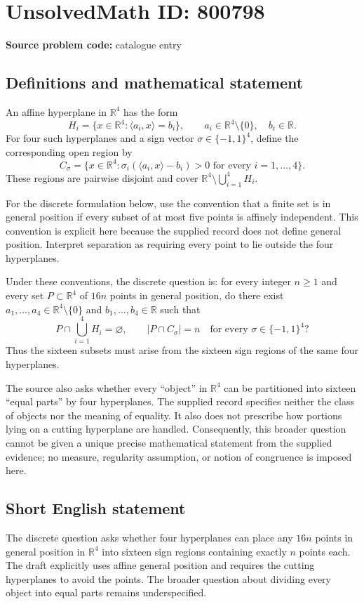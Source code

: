 \documentclass[11pt]{article}
\newcommand{\R}{\mathbb{R}}
\begin{document}
\section*{UnsolvedMath ID: 800798}
\textbf{Source problem code:} catalogue entry
\subsection{Definitions and mathematical statement}
An affine hyperplane in \(\R^4\) has the form
\[
H_i=\{x\in\R^4:\langle a_i,x\rangle=b_i\},\qquad a_i\in\R^4\setminus\{0\},\quad b_i\in\R.
\]
For four such hyperplanes and a sign vector \(\sigma\in\{-1,1\}^4\), define the corresponding open region by
\[
C_\sigma=\{x\in\R^4:\sigma_i(\langle a_i,x\rangle-b_i)>0\text{ for every }i=1,\ldots,4\}.
\]
These regions are pairwise disjoint and cover \(\R^4\setminus\bigcup_{i=1}^4H_i\).

For the discrete formulation below, use the convention that a finite set is in general position if every subset of at most five points is affinely independent. This convention is explicit here because the supplied record does not define general position. Interpret separation as requiring every point to lie outside the four hyperplanes.

Under these conventions, the discrete question is: for every integer \(n\geq1\) and every set \(P\subset\R^4\) of \(16n\) points in general position, do there exist \(a_1,\ldots,a_4\in\R^4\setminus\{0\}\) and \(b_1,\ldots,b_4\in\R\) such that
\[
P\cap\bigcup_{i=1}^4H_i=\varnothing,
\qquad
\lvert P\cap C_\sigma\rvert=n
\quad\text{for every }\sigma\in\{-1,1\}^4?
\]
Thus the sixteen subsets must arise from the sixteen sign regions of the same four hyperplanes.

The source also asks whether every ``object'' in \(\R^4\) can be partitioned into sixteen ``equal parts'' by four hyperplanes. The supplied record specifies neither the class of objects nor the meaning of equality. It also does not prescribe how portions lying on a cutting hyperplane are handled. Consequently, this broader question cannot be given a unique precise mathematical statement from the supplied evidence; no measure, regularity assumption, or notion of congruence is imposed here.
\subsection{Short English statement}
The discrete question asks whether four hyperplanes can place any \(16n\) points in general position in \(\R^4\) into sixteen sign regions containing exactly \(n\) points each. The draft explicitly uses affine general position and requires the cutting hyperplanes to avoid the points. The broader question about dividing every object into equal parts remains underspecified.
\end{document}
